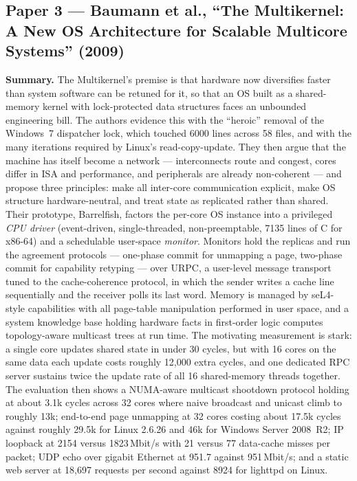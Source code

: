 \subsection*{Paper 3 --- Baumann et al., ``The Multikernel: A New OS Architecture for Scalable Multicore Systems'' (2009)}
\label{p4:sec:multikernel}

\textbf{Summary.} The Multikernel's premise is that hardware now diversifies faster than
system software can be retuned for it, so that an OS built as a shared-memory kernel with
lock-protected data structures faces an unbounded engineering bill. The authors evidence this
with the ``heroic'' removal of the Windows~7 dispatcher lock, which touched 6000 lines across
58 files, and with the many iterations required by Linux's read-copy-update. They then argue
that the machine has itself become a network --- interconnects route and congest, cores
differ in ISA and performance, and peripherals are already non-coherent --- and propose three
principles: make all inter-core communication explicit, make OS structure hardware-neutral,
and treat state as replicated rather than shared. Their prototype, Barrelfish, factors the
per-core OS instance into a privileged \emph{CPU driver} (event-driven, single-threaded,
non-preemptable, 7135 lines of C for x86-64) and a schedulable user-space \emph{monitor}.
Monitors hold the replicas and run the agreement protocols --- one-phase commit for unmapping
a page, two-phase commit for capability retyping --- over URPC, a user-level message
transport tuned to the cache-coherence protocol, in which the sender writes a cache line
sequentially and the receiver polls its last word. Memory is managed by seL4-style
capabilities with all page-table manipulation performed in user space, and a system knowledge
base holding hardware facts in first-order logic computes topology-aware multicast trees at
run time. The motivating measurement is stark: a single core updates shared state in under 30
cycles, but with 16 cores on the same data each update costs roughly 12{,}000 extra cycles,
and one dedicated RPC server sustains twice the update rate of all 16 shared-memory threads
together. The evaluation then shows a NUMA-aware multicast shootdown protocol holding at
about 3.1k cycles across 32 cores where naive broadcast and unicast climb to roughly 13k;
end-to-end page unmapping at 32 cores costing about 17.5k cycles against roughly 29.5k for
Linux 2.6.26 and 46k for Windows Server 2008~R2; IP loopback at 2154 versus 1823\,Mbit/s with 21
versus 77 data-cache misses per packet; UDP echo over gigabit Ethernet at 951.7 against
951\,Mbit/s; and a static web server at 18{,}697 requests per second against 8924 for
lighttpd on Linux.

